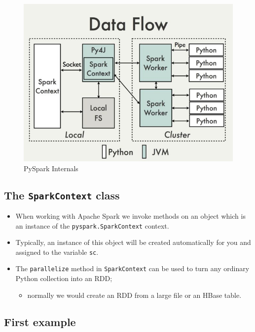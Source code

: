 \documentclass[11pt]{article}
\providecommand{\tightlist}{%
      \setlength{\itemsep}{0pt}\setlength{\parskip}{0pt}}
\begin{document}
\begin{figure}
\centering
\includegraphics{images/YlI8AqEl.png}
\caption{PySpark Internals}
\end{figure}

\subsection{\texorpdfstring{The \texttt{SparkContext}
class}{The SparkContext class}}\label{the-sparkcontext-class}

\begin{itemize}
\item
  When working with Apache Spark we invoke methods on an object which is
  an instance of the \texttt{pyspark.SparkContext} context.
\item
  Typically, an instance of this object will be created automatically
  for you and assigned to the variable \texttt{sc}.
\item
  The \texttt{parallelize} method in \texttt{SparkContext} can be used
  to turn any ordinary Python collection into an RDD;

  \begin{itemize}
  \tightlist
  \item
    normally we would create an RDD from a large file or an HBase table.
  \end{itemize}
\end{itemize}

    \subsection{First example}\label{first-example}
\end{document}

